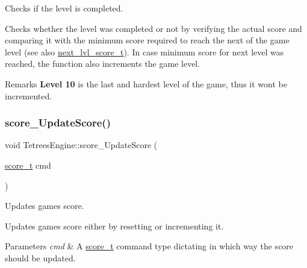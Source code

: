 Checks if the level is completed. 

Checks whether the level was completed or not by verifying the actual score and comparing it with the minimum score required to reach the next of the game level (see also \mbox{\hyperlink{TetreesDefs_8hpp_adb9f7ea75cb8fca17c40bc2afbe399ca}{next\+\_\+lvl\+\_\+score\+\_\+t}}). In case minimum score for next level was reached, the function also increments the game level. \begin{DoxyRemark}{Remarks}
{\bfseries Level 10} is the last and hardest level of the game, thus it won\textquotesingle{}t be incremented. 
\end{DoxyRemark}
\mbox{\label{classTetreesEngine_a856a9de6a79138a19b638d9287d7bc72}} 
\subsubsection{\texorpdfstring{score\+\_\+\+Update\+Score()}{score\_UpdateScore()}}
{\footnotesize\ttfamily void Tetrees\+Engine\+::score\+\_\+\+Update\+Score (\begin{DoxyParamCaption}\item[{\mbox{\hyperlink{TetreesDefs_8hpp_a5a3b4d94c69ae85b911a8dca1afedfe0}{score\+\_\+t}}}]{cmd }\end{DoxyParamCaption})\hspace{0.3cm}{\ttfamily [private]}}



Updates game\textquotesingle{}s score. 

Updates game\textquotesingle{}s score either by resetting or incrementing it. 
\begin{DoxyParams}{Parameters}
{\em cmd} & A \mbox{\hyperlink{TetreesDefs_8hpp_a5a3b4d94c69ae85b911a8dca1afedfe0}{score\+\_\+t}} command type dictating in which way the score should be updated. \\
\hline
\end{DoxyParams}
\mbox{\label{classTetreesEngine_a0978ef1f287f00a8ed5a4af2d680b943}} 
